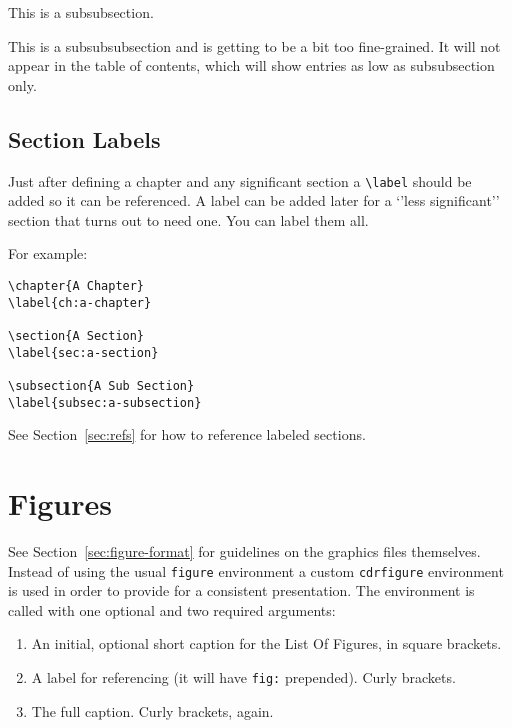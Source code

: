 This is a subsubsection.


This is a subsubsubsection and is getting to be a bit too fine-grained. It will not appear in 
the table of contents, which will show entries as low as subsubsection only.

\subsection{Section Labels}

Just after defining a chapter and any significant section a
\verb|\label| should be added so it can be referenced.
A label can be added later for a `'less significant'' section that
turns out to need one. You can label them all. 

For example:

\begin{verbatim}
\chapter{A Chapter}
\label{ch:a-chapter}

\section{A Section}
\label{sec:a-section}

\subsection{A Sub Section}
\label{subsec:a-subsection}
\end{verbatim}

See Section~\ref{sec:refs} for how to reference labeled sections.

\FloatBarrier
\section{Figures}
\label{sec:figures}

See Section~\ref{sec:figure-format} for guidelines on the graphics files themselves.
Instead of using the usual \texttt{figure} environment a custom \texttt{cdrfigure}
environment is used in order to provide for a consistent presentation.
The environment is called with one optional and two required
arguments:

\begin{enumerate}
\item An initial, optional short caption for the List Of Figures, in square brackets.
\item A label for referencing (it will have \texttt{fig:} prepended). Curly brackets.
\item The full caption. Curly brackets, again.
\end{enumerate}

